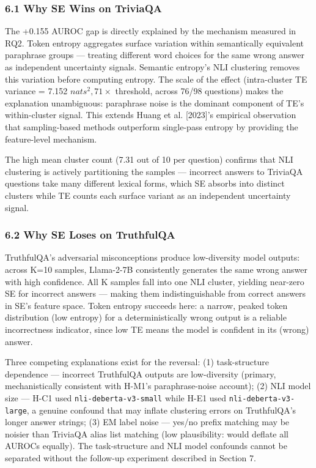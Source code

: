
\subsubsection{6.1 Why SE Wins on TriviaQA}

The +0.155 AUROC gap is directly explained by the mechanism measured in RQ2. Token entropy aggregates surface variation within semantically equivalent paraphrase groups --- treating different word choices for the same wrong answer as independent uncertainty signals. Semantic entropy's NLI clustering removes this variation before computing entropy. The scale of the effect (intra-cluster TE variance = 7.152 $nats^2, 71\times$ threshold, across 76/98 questions) makes the explanation unambiguous: paraphrase noise is the dominant component of TE's within-cluster signal. This extends Huang et al. [2023]'s empirical observation that sampling-based methods outperform single-pass entropy by providing the feature-level mechanism.

The high mean cluster count (7.31 out of 10 per question) confirms that NLI clustering is actively partitioning the samples --- incorrect answers to TriviaQA questions take many different lexical forms, which SE absorbs into distinct clusters while TE counts each surface variant as an independent uncertainty signal.

\subsubsection{6.2 Why SE Loses on TruthfulQA}

TruthfulQA's adversarial misconceptions produce low-diversity model outputs: across K=10 samples, Llama-2-7B consistently generates the same wrong answer with high confidence. All K samples fall into one NLI cluster, yielding near-zero SE for incorrect answers --- making them indistinguishable from correct answers in SE's feature space. Token entropy succeeds here: a narrow, peaked token distribution (low entropy) for a deterministically wrong output is a reliable incorrectness indicator, since low TE means the model is confident in its (wrong) answer.

Three competing explanations exist for the reversal: (1) task-structure dependence --- incorrect TruthfulQA outputs are low-diversity (primary, mechanistically consistent with H-M1's paraphrase-noise account); (2) NLI model size --- H-C1 used \texttt{nli-deberta-v3-small} while H-E1 used \texttt{nli-deberta-v3-large}, a genuine confound that may inflate clustering errors on TruthfulQA's longer answer strings; (3) EM label noise --- yes/no prefix matching may be noisier than TriviaQA alias list matching (low plausibility: would deflate all AUROCs equally). The task-structure and NLI model confounds cannot be separated without the follow-up experiment described in Section 7.

